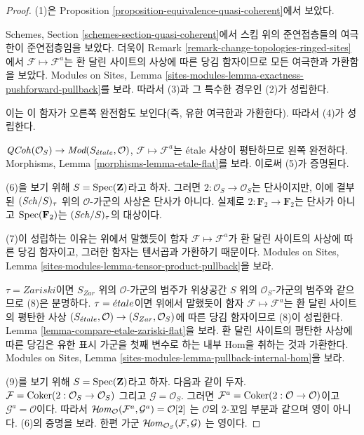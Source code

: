 \begin{proof}
(1)은 Proposition \ref{proposition-equivalence-quasi-coherent}에서 보았다.

\medskip\noindent
Schemes, Section \ref{schemes-section-quasi-coherent}에서 스킴 위의
준연접층들의 여극한이 준연접층임을 보았다. 더욱이 Remark
\ref{remark-change-topologies-ringed-sites}에서
$\mathcal{F} \mapsto \mathcal{F}^a$는 환 달린 사이트의 사상에 따른
당김 함자이므로 모든 여극한과 가환함을 보았다. Modules on Sites,
Lemma \ref{sites-modules-lemma-exactness-pushforward-pullback}를 보라.
따라서 (3)과 그 특수한 경우인 (2)가 성립한다.

\medskip\noindent
이는 이 함자가 오른쪽 완전함도 보인다(즉, 유한 여극한과 가환한다).
따라서 (4)가 성립한다.

\medskip\noindent
$\mathit{QCoh}(\mathcal{O}_S) \to
\textit{Mod}(S_{\acute{e}tale}, \mathcal{O})$,
$\mathcal{F} \mapsto \mathcal{F}^a$는 \'etale 사상이 평탄하므로
왼쪽 완전하다. Morphisms, Lemma \ref{morphisms-lemma-etale-flat}를 보라.
이로써 (5)가 증명된다.

\medskip\noindent
(6)을 보기 위해 $S = \mathop{\mathrm{Spec}}(\mathbf{Z})$라고 하자. 그러면
$2 : \mathcal{O}_S \to \mathcal{O}_S$는 단사이지만, 이에 결부된
$(\mathit{Sch}/S)_\tau$ 위의 $\mathcal{O}$-가군의 사상은 단사가 아니다.
실제로 $2 : \mathbf{F}_2 \to \mathbf{F}_2$는 단사가 아니고
$\mathop{\mathrm{Spec}}(\mathbf{F}_2)$는 $(\mathit{Sch}/S)_\tau$의 대상이다.

\medskip\noindent
(7)이 성립하는 이유는 위에서 말했듯이 함자
$\mathcal{F} \mapsto \mathcal{F}^a$가 환 달린 사이트의 사상에 따른
당김 함자이고, 그러한 함자는 텐서곱과 가환하기 때문이다. Modules on Sites,
Lemma \ref{sites-modules-lemma-tensor-product-pullback}을 보라.

\medskip\noindent
$\tau = Zariski$이면 $S_{Zar}$ 위의 $\mathcal{O}$-가군의 범주가
위상공간 $S$ 위의 $\mathcal{O}_S$-가군의 범주와 같으므로 (8)은 분명하다.
$\tau = {\acute{e}tale}$이면 위에서 말했듯이 함자
$\mathcal{F} \mapsto \mathcal{F}^a$는 환 달린 사이트의 평탄한 사상
$(S_{\acute{e}tale}, \mathcal{O}) \to (S_{Zar}, \mathcal{O}_S)$에 따른 당김
함자이므로 (8)이 성립한다. Lemma
\ref{lemma-compare-etale-zariski-flat}을 보라. 환 달린 사이트의 평탄한
사상에 따른 당김은 유한 표시 가군을 첫째 변수로 하는 내부 Hom을 취하는
것과 가환한다. Modules on Sites, Lemma
\ref{sites-modules-lemma-pullback-internal-hom}을 보라.

\medskip\noindent
(9)를 보기 위해 $S = \mathop{\mathrm{Spec}}(\mathbf{Z})$라고 하자. 다음과 같이 두자.
$\mathcal{F} = \mathop{\mathrm{Coker}}(2 : \mathcal{O}_S \to \mathcal{O}_S)$
그리고 $\mathcal{G} = \mathcal{O}_S$.
그러면 $\mathcal{F}^a = \mathop{\mathrm{Coker}}(2 : \mathcal{O} \to \mathcal{O})$이고
$\mathcal{G}^a = \mathcal{O}$이다. 따라서
$\mathop{\mathcal{H}\!\mathit{om}}\nolimits_\mathcal{O}(\mathcal{F}^a, \mathcal{G}^a) = \mathcal{O}[2]$
는 $\mathcal{O}$의 $2$-꼬임 부분과 같으며 영이 아니다. (6)의 증명을 보라.
한편 가군
$\mathop{\mathcal{H}\!\mathit{om}}\nolimits_{\mathcal{O}_S}(\mathcal{F}, \mathcal{G})$
는 영이다.


\end{proof}
